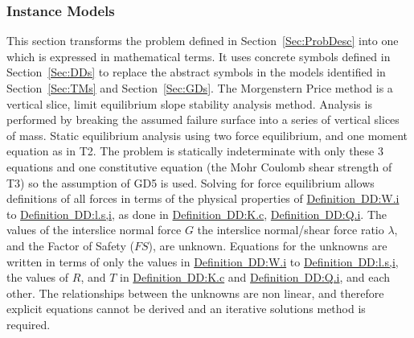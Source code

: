\documentclass[12pt]{article}
\begin{document}
\subsubsection{Instance Models}
\label{Sec:IMs}
This section transforms the problem defined in Section~\ref{Sec:ProbDesc} into one which is expressed in mathematical terms. It uses concrete symbols defined in Section~\ref{Sec:DDs} to replace the abstract symbols in the models identified in Section~\ref{Sec:TMs} and Section~\ref{Sec:GDs}.
The Morgenstern Price method is a vertical slice, limit equilibrium slope stability analysis method. Analysis is performed by breaking the assumed failure surface into a series of vertical slices of mass. Static equilibrium analysis using two force equilibrium, and one moment equation as in T2. The problem is statically indeterminate with only these 3 equations and one constitutive equation (the Mohr Coulomb shear strength of T3) so the assumption of GD5 is used. Solving for force equilibrium allows definitions of all forces in terms of the physical properties of \hyperref[DD:W.i]{Definition~DD:W.i} to \hyperref[DD:l.s,i]{Definition~DD:l.s,i}, as done in \hyperref[DD:K.c]{Definition~DD:K.c}, \hyperref[DD:Q.i]{Definition~DD:Q.i}.
The values of the interslice normal force $G$ the interslice normal/shear force ratio $λ$, and the Factor of Safety ($FS$), are unknown. Equations for the unknowns are written in terms of only the values in \hyperref[DD:W.i]{Definition~DD:W.i} to \hyperref[DD:l.s,i]{Definition~DD:l.s,i}, the values of $R$, and $T$ in \hyperref[DD:K.c]{Definition~DD:K.c} and \hyperref[DD:Q.i]{Definition~DD:Q.i}, and each other. The relationships between the unknowns are non linear, and therefore explicit equations cannot be derived and an iterative solutions method is required.
~\newline
\end{document}
